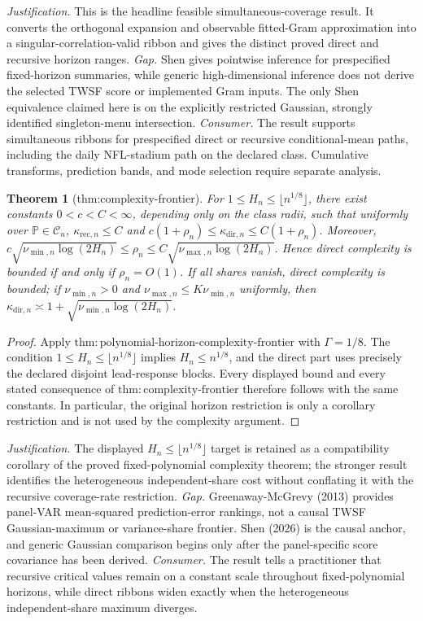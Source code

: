 \documentclass{article}
\newtheorem{theorem}{Theorem}
\begin{document}
\par\smallskip\noindent \textit{Justification.} This is the headline feasible simultaneous-coverage result. It converts the orthogonal expansion and observable fitted-Gram approximation into a singular-correlation-valid ribbon and gives the distinct proved direct and recursive horizon ranges. \textit{Gap.} Shen gives pointwise inference for prespecified fixed-horizon summaries, while generic high-dimensional inference does not derive the selected TWSF score or implemented Gram inputs. The only Shen equivalence claimed here is on the explicitly restricted Gaussian, strongly identified singleton-menu intersection. \textit{Consumer.} The result supports simultaneous ribbons for prespecified direct or recursive conditional-mean paths, including the daily NFL-stadium path on the declared class. Cumulative transforms, prediction bands, and mode selection require separate analysis.

\begin{theorem}[thm:complexity-frontier]\label{thm:complexity-frontier}
For \(1\le H_n\le\lfloor n^{1/8}\rfloor\), there exist constants \(0<c<C<\infty\), depending only on the class radii, such that uniformly over \(\mathbb P\in\mathcal C_n\), \(\kappa_{\mathrm{rec},n}\le C\) and \(c(1+\rho_n)\le\kappa_{\mathrm{dir},n}\le C(1+\rho_n)\). Moreover, \(c\sqrt{\nu_{\min,n}\log(2H_n)}\le\rho_n\le C\sqrt{\nu_{\max,n}\log(2H_n)}\). Hence direct complexity is bounded if and only if \(\rho_n=O(1)\). If all shares vanish, direct complexity is bounded; if \(\nu_{\min,n}>0\) and \(\nu_{\max,n}\le K\nu_{\min,n}\) uniformly, then \(\kappa_{\mathrm{dir},n}\asymp1+\sqrt{\nu_{\min,n}\log(2H_n)}\).
\end{theorem}
\begin{proof}
Apply \(\mathrm{thm{:}polynomial\mbox{-}horizon\mbox{-}complexity\mbox{-}frontier}\) with \(\Gamma=1/8\).  The condition \(1\le H_n\le\lfloor n^{1/8}\rfloor\) implies \(H_n\le n^{1/8}\), and the direct part uses precisely the declared disjoint lead-response blocks.  Every displayed bound and every stated consequence of \(\mathrm{thm{:}complexity\mbox{-}frontier}\) therefore follows with the same constants.  In particular, the original horizon restriction is only a corollary restriction and is not used by the complexity argument.
\end{proof}
\par\smallskip\noindent \textit{Justification.} The displayed \(H_n\le\lfloor n^{1/8}\rfloor\) target is retained as a compatibility corollary of the proved fixed-polynomial complexity theorem; the stronger result identifies the heterogeneous independent-share cost without conflating it with the recursive coverage-rate restriction. \textit{Gap.} Greenaway-McGrevy (2013) provides panel-VAR mean-squared prediction-error rankings, not a causal TWSF Gaussian-maximum or variance-share frontier. Shen (2026) is the causal anchor, and generic Gaussian comparison begins only after the panel-specific score covariance has been derived. \textit{Consumer.} The result tells a practitioner that recursive critical values remain on a constant scale throughout fixed-polynomial horizons, while direct ribbons widen exactly when the heterogeneous independent-share maximum diverges.
\end{document}
